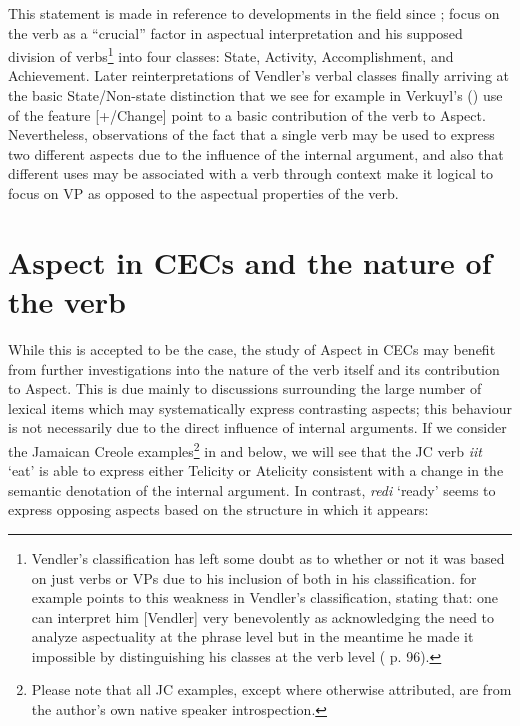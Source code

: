 This statement is made in reference to developments in the field since
; focus on the verb as a ``crucial'' factor in
aspectual interpretation and his supposed division of
verbs\footnote{Vendler's classification has left some doubt as to
  whether or not it was based on just verbs or VPs due to his
  inclusion of both in his classification.  \citet{Verkuyl1999} for
  example points to this weakness in Vendler's classification,
  stating that: one can interpret him [Vendler] very benevolently as
  acknowledging the need to analyze aspectuality at the phrase level
  but in the meantime he made it impossible by distinguishing his
  classes at the verb level ( p. 96).}  into four classes: State,
Activity, Accomplishment, and Achievement.  Later reinterpretations of
Vendler's verbal classes finally arriving at the basic State\slash Non-state
distinction that we see for example in Verkuyl's (\citeyear{Verkuyl1993,Verkuyl1999}) use of
the feature [+/\textminus Change] point to a basic contribution of the verb to
Aspect. Nevertheless, observations of the fact that a single verb may
be used to express two different aspects due to the influence of the
internal argument, \parencites(etc.)[cf.][]{Dowty1979,Dahl1981,Verkuyl1993,Tenny1994,MacDonald2008} and
also that different uses may be associated with a verb through context
\citep[cf.][4]{Tenny1994} make it logical to focus on VP as opposed to the
aspectual properties of the verb.

\section{Aspect in CECs and the nature of the verb}\label{sec:1.3}

While this is accepted to be the case, the study of Aspect in CECs may
benefit from further investigations into the nature of the verb itself
and its contribution to Aspect.  This is due mainly to discussions
surrounding the large number of lexical items which may systematically
express contrasting aspects; this behaviour is not necessarily due to
the direct influence of internal arguments.  If we consider the
Jamaican Creole examples\footnote{Please note that all JC
  examples, except where otherwise attributed, are from the author's
  own native speaker introspection.} in  and 
below, we will see that the JC  verb \textit{iit}
`eat' is able to express either Telicity or Atelicity consistent with
a change in the semantic denotation of the internal argument.  In
contrast, \textit{redi} `ready' seems to express opposing aspects
based on the structure in which it appears:

